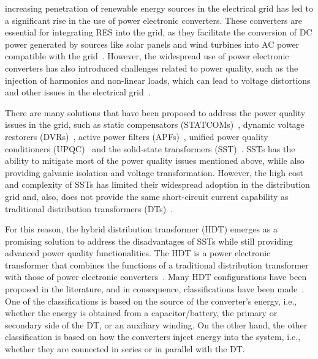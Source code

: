  increasing penetration of renewable energy sources in the electrical grid has led to a significant rise in the use of power electronic converters. These converters are essential for integrating RES into the grid, as they facilitate the conversion of DC power generated by sources like solar panels and wind turbines into AC power compatible with the grid~\cite{Blaabjerg2023}. However, the widespread use of power electronic converters has also introduced challenges related to power quality, such as the injection of harmonics and non-linear loads, which can lead to voltage distortions and other issues in the electrical grid~\cite{Najafzadeh2021,Sepasi2023}.

There are many solutions that have been proposed to address the power quality issues in the grid, such as static compensators (STATCOMs)~\cite{Engelbrecht2023}, dynamic voltage restorers (DVRs)~\cite{Kandil2020}, active power filters (APFs)~\cite{Mishra2020}, unified power quality conditioners (UPQC)~\cite{Fujita1998} and the solid-state transformers (SST)~\cite{Huber2019}. SSTs has the ability to mitigate most of the power quality issues mentioned above, while also providing galvanic isolation and voltage transformation. However, the high cost and complexity of SSTs has limited their widespread adoption in the distribution grid and, also, does not provide the same short-circuit current capability as traditional distribution transformers (DTs)~\cite{carrenoConfigurationsPowerTopologies2021}.

For this reason, the hybrid distribution transformer (HDT) emerges as a promising solution to address the disadvantages of SSTs while still providing advanced power quality functionalities.
The HDT is a power electronic transformer that combines the functions of a traditional distribution transformer with those of power electronic converters~\cite{haj-maharsiHybridDistributionTransformer2010,matelskiBadaniaEksperymentalneTransformatora2023}. Many HDT configurations have been proposed in the literature, and in consequence, classifications have been made~\cite{carrenoConfigurationsPowerTopologies2021}. One of the classifications is based on the source of the converter's energy, i.e., whether the energy is obtained from a capacitor/battery, the primary or secondary side of the DT, or an auxiliary winding. On the other hand, the other classification is based on how the converters inject energy into the system, i.e., whether they are connected in series or in parallel with the DT. 

